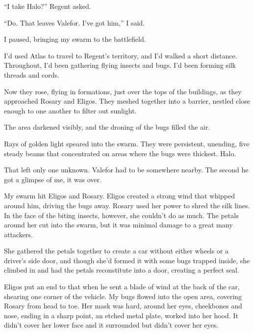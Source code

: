 ``I take Halo?'' Regent asked.



``Do.  That leaves Valefor.  I've got him,'' I said.



I paused, bringing my swarm to the battlefield.



I'd used Atlas to travel to Regent's territory, and I'd walked a short distance.  Throughout, I'd been gathering flying insects and bugs.  I'd been forming silk threads and cords.



Now they rose, flying in formations, just over the tops of the buildings, as they approached Rosary and Eligos.  They meshed together into a barrier, nestled close enough to one another to filter out sunlight.



The area darkened visibly, and the droning of the bugs filled the air.



Rays of golden light speared into the swarm.  They were persistent, unending, five steady beams that concentrated on areas where the bugs were thickest.  Halo.



That left only one unknown.  Valefor had to be somewhere nearby.  The second he got a glimpse of me, it was over.



My swarm hit Eligos and Rosary.  Eligos created a strong wind that whipped around him, driving the bugs away.  Rosary used her power to shred the silk lines.  In the face of the biting insects, however, she couldn't do as much.  The petals around her cut into the swarm, but it was minimal damage to a great many attackers.



She gathered the petals together to create a car without either wheels or a driver's side door, and though she'd formed it with some bugs trapped inside, she climbed in and had the petals reconstitute into a door, creating a perfect seal.



Eligos put an end to that when he sent a blade of wind at the back of the car, shearing one corner of the vehicle.  My bugs flowed into the open area, covering Rosary from head to toe.  Her mask was hard, around her eyes, cheekbones and nose, ending in a sharp point, an etched metal plate, worked into her hood.  It didn't cover her lower face and it surrounded but didn't cover her eyes.



